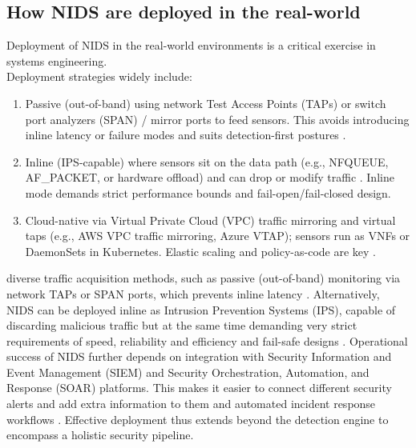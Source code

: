 \subsection{How NIDS are deployed in the real-world}\label{sec:deployment}
Deployment of NIDS in the real-world environments is a critical exercise in systems engineering.\\
\noindent Deployment strategies widely include:
\begin{enumerate}[label=\alph*)]
\item  Passive (out-of-band) using network Test Access Points (TAPs) or switch port analyzers (SPAN) / mirror ports to feed sensors. This avoids introducing inline latency or failure modes and suits detection-first postures \parencite{SuricataDocs2025}.
\item  Inline (IPS-capable) where sensors sit on the data path (e.g., NFQUEUE, AF\_PACKET, or hardware offload) and can drop or modify traffic \parencite{SuricataIPS2024,CiscoSnort3Guide2024}. Inline mode demands strict performance bounds and fail-open/fail-closed design.
\item  Cloud-native via Virtual Private Cloud (VPC) traffic mirroring and virtual taps (e.g., AWS VPC traffic mirroring, Azure VTAP); sensors run as VNFs or DaemonSets in Kubernetes. Elastic scaling and policy-as-code are key \parencite{Diana2025Overview}.
\end{enumerate}
diverse traffic acquisition methods, such as passive (out-of-band) monitoring via network TAPs or SPAN ports, which prevents inline latency \parencite{SuricataDocs2025}. Alternatively, NIDS can be deployed inline as Intrusion Prevention Systems (IPS), capable of discarding malicious traffic but at the same time demanding very strict requirements of speed, reliability and efficiency and fail-safe designs \parencite{CiscoSnort3Guide2024}. Operational success of NIDS further depends on integration with Security Information and Event Management (SIEM) and Security Orchestration, Automation, and Response (SOAR) platforms. 
This  makes it easier to connect different security alerts and add extra information to them and automated incident response workflows \parencite{Diana2025Overview}. Effective deployment thus extends beyond the detection engine to encompass a holistic security pipeline.

